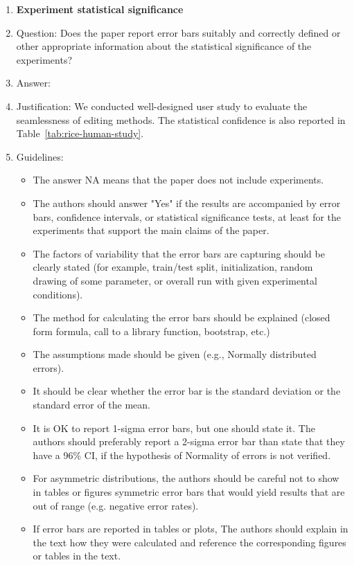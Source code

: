 \documentclass{article}
\begin{document}
\begin{enumerate}
\item {\bf Experiment statistical significance}
    \item[] Question: Does the paper report error bars suitably and correctly defined or other appropriate information about the statistical significance of the experiments?
    \item[] Answer: \answerYes{} %
    \item[] Justification: We conducted well-designed user study to evaluate the seamlessness of editing methods. The statistical confidence is also reported in Table~\ref{tab:rice-human-study}.
    \item[] Guidelines:
    \begin{itemize}
        \item The answer NA means that the paper does not include experiments.
        \item The authors should answer "Yes" if the results are accompanied by error bars, confidence intervals, or statistical significance tests, at least for the experiments that support the main claims of the paper.
        \item The factors of variability that the error bars are capturing should be clearly stated (for example, train/test split, initialization, random drawing of some parameter, or overall run with given experimental conditions).
        \item The method for calculating the error bars should be explained (closed form formula, call to a library function, bootstrap, etc.)
        \item The assumptions made should be given (e.g., Normally distributed errors).
        \item It should be clear whether the error bar is the standard deviation or the standard error of the mean.
        \item It is OK to report 1-sigma error bars, but one should state it. The authors should preferably report a 2-sigma error bar than state that they have a 96\% CI, if the hypothesis of Normality of errors is not verified.
        \item For asymmetric distributions, the authors should be careful not to show in tables or figures symmetric error bars that would yield results that are out of range (e.g. negative error rates).
        \item If error bars are reported in tables or plots, The authors should explain in the text how they were calculated and reference the corresponding figures or tables in the text.
    \end{itemize}


\end{enumerate}
\end{document}
